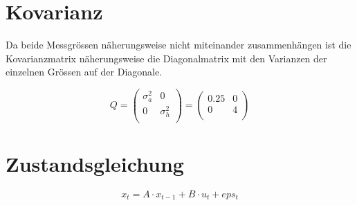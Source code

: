 \documentclass[12pt,a4paper]{article}
\begin{document}
\section{Kovarianz}
Da beide Messgrössen näherungsweise nicht miteinander zusammenhängen ist die Kovarianzmatrix näherungsweise die Diagonalmatrix mit den Varianzen der einzelnen Grössen auf der Diagonale.

\[
Q = \begin{pmatrix}
\sigma_a^2 & 0 \\
0 & \sigma_h^2 \\
\end{pmatrix}
 = \begin{pmatrix}
0.25 & 0 \\
0 & 4 \\
\end{pmatrix}
\]

\section{Zustandsgleichung}
\[x_t = A \cdot x_{t-1} + B \cdot u_t + eps_t\]
\end{document}
